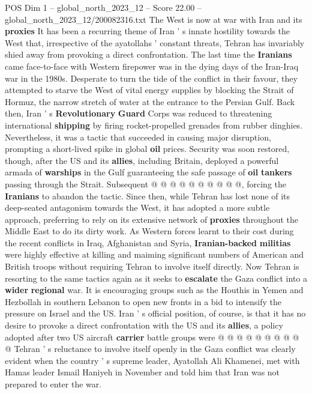 \begin{textsample}{POS Dim 1 – global\_north\_2023\_12 – Score 22.00 – global\_north\_2023\_12/200082316.txt}  \label{ex:f1_pos_253}
The West is now at war with Iran and its \textbf{proxies} It has been a recurring theme of Iran ' s innate hostility towards the West that, irrespective of the ayatollahs ' constant threats, Tehran has invariably shied away from provoking a direct confrontation.
The last time the \textbf{Iranians} came face-to-face with Western firepower was in the dying days of the Iran-Iraq war in the 1980s.
Desperate to turn the tide of the conflict in their favour, they attempted to starve the West of vital energy supplies by blocking the Strait of Hormuz, the narrow stretch of water at the entrance to the Persian Gulf.
Back then, Iran ' s \textbf{Revolutionary} \textbf{Guard} Corps was reduced to threatening international \textbf{shipping} by firing rocket-propelled grenades from rubber dinghies.
Nevertheless, it was a tactic that succeeded in causing major disruption, prompting a short-lived spike in global \textbf{oil} prices.
Security was soon restored, though, after the US and its \textbf{allies}, including Britain, deployed a powerful armada of \textbf{warships} in the Gulf guaranteeing the safe passage of \textbf{oil} \textbf{tankers} passing through the Strait.
Subsequent @ @ @ @ @ @ @ @ @ @, forcing the \textbf{Iranians} to abandon the tactic.
Since then, while Tehran has lost none of its deep-seated antagonism towards the West, it has adopted a more subtle approach, preferring to rely on its extensive network of \textbf{proxies} throughout the Middle East to do its dirty work.
As Western forces learnt to their cost during the recent conflicts in Iraq, Afghanistan and Syria, \textbf{Iranian-backed} \textbf{militias} were highly effective at killing and maiming significant numbers of American and British troops without requiring Tehran to involve itself directly.
Now Tehran is resorting to the same tactics again as it seeks to \textbf{escalate} the Gaza conflict into a \textbf{wider} \textbf{regional} war.
It is encouraging groups such as the Houthis in Yemen and Hezbollah in southern Lebanon to open new fronts in a bid to intensify the pressure on Israel and the US.
Iran ' s official position, of course, is that it has no desire to provoke a direct confrontation with the US and its \textbf{allies}, a policy adopted after two US aircraft \textbf{carrier} battle groups were @ @ @ @ @ @ @ @ @ @ Tehran ' s reluctance to involve itself openly in the Gaza conflict was clearly evident when the country ' s supreme leader, Ayatollah Ali Khamenei, met with Hamas leader Ismail Haniyeh in November and told him that Iran was not prepared to enter the war.

\end{textsample}
